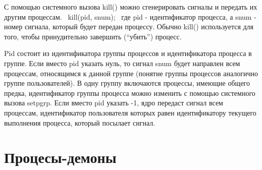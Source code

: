С помощью системного вызова kill() можно сгенерировать сигналы и передать их другим процессам. 
kill(pid, snum); 
где pid - идентификатор процесса, а snum - номер сигнала, который будет передан процессу. Обычно kill() используется для того, чтобы принудительно завершить (``убить'') процесс. 

Pid состоит из идентификатора группы процессов и идентификатора процесса в группе. Если вместо pid указать нуль, то сигнал snum будет направлен всем процессам, относящимся к данной группе (понятие группы процессов аналогично группе пользователей). В одну группу включаются процессы, имеющие общего предка, идентификатор группы процесса можно изменить с помощью системного вызова setpgrp. Если вместо pid указать -1, ядро передаст сигнал всем процессам, идентификатор пользователя которых равен идентификатору текущего выполнения процесса, который посылает сигнал.

\chapter{Процесы-демоны}

